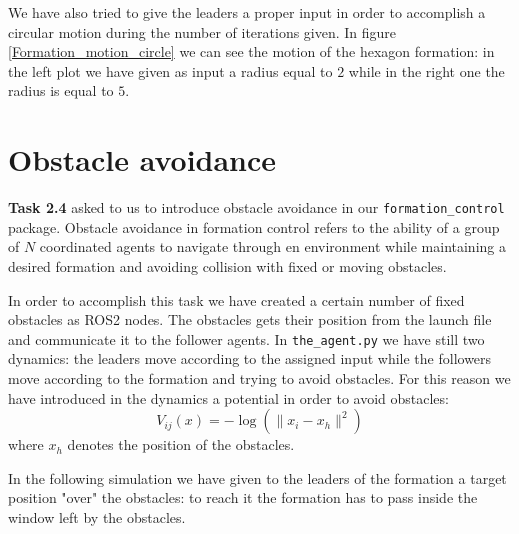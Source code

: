 \documentclass[a4paper,11pt,oneside]{book}
\begin{document}
\bigskip
We have also tried to give the leaders a proper input in order to accomplish a circular motion during the number of iterations given. In figure \ref{Formation_motion_circle} we can see the motion of the hexagon formation: in the left plot we have given as input a radius equal to $2$ while in the right one the radius is equal to $5$.



\section{Obstacle avoidance}
\textbf{Task 2.4} asked to us to introduce obstacle avoidance in our \texttt{formation\_control} package. Obstacle avoidance in formation control refers to the ability of a group of $N$ coordinated agents to navigate through en environment while maintaining a desired formation and avoiding collision with fixed or moving obstacles. 

In order to accomplish this task we have created a certain number of fixed obstacles as ROS2 nodes. The obstacles gets their position from the launch file and communicate it to the follower agents. 
In \texttt{the\_agent.py} we have still two dynamics: the leaders move according to the assigned input while the followers move according to the formation and trying to avoid obstacles. For this reason we have introduced in the dynamics a potential in order to avoid obstacles:
\begin{equation}
V_{ij}(x) = - \log( \lVert x_i - x_h\rVert ^2)
\label{Obstacles_barrier}
\end{equation}
where $x_h$ denotes the position of the obstacles.

In the following simulation we have given to the leaders of the formation a target position "over" the obstacles: to reach it the formation has to pass inside the window left by the obstacles. 
\end{document}

